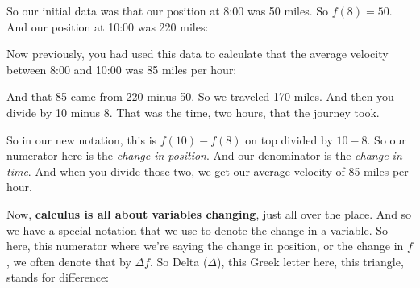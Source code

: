 \documentclass[pdftex, brazil, 12pt, twoside]{article}
\begin{document}
So our initial data was that our position at 8:00 was 50 miles.
So $f(8) = 50$. And our position at 10:00 was 220 miles:

\begin{figure}[H]
  \begin{center}
  \end{center}
\end{figure}

Now previously, you had used this data
to calculate that the average velocity between 8:00 and 10:00
was 85 miles per hour:

\begin{figure}[H]
  \begin{center}
  \end{center}
\end{figure}

And that 85 came from 220 minus 50.
So we traveled 170 miles.
And then you divide by 10 minus 8.
That was the time, two hours, that the journey took.

So in our new notation, this is $f(10) - f(8)$
on top divided by $10 - 8$.
So our numerator here is the \emph{change in position}.
And our denominator is the \emph{change in time}.
And when you divide those two, we
get our average velocity of 85 miles per hour.

Now, \textbf{calculus is all about variables changing}, just
all over the place.
And so we have a special notation
that we use to denote the change in a variable.
So here, this numerator where we're
saying the change in position, or the change in $f$,
we often denote that by $\Delta f$.
So Delta ($\Delta$), this Greek letter here, this triangle,
stands for difference:
\end{document}

